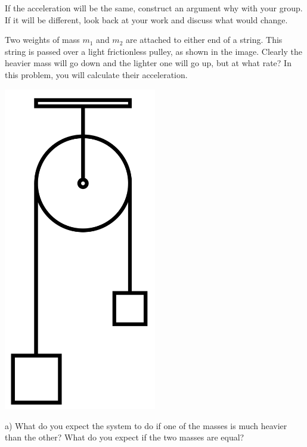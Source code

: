 \documentclass[12pt]{article}
\begin{document}
		If the acceleration will be the same, construct an argument why with your group. If it will be different, look back at your work and discuss what would change.
		
		\newpage
		
		
		\begin{minipage}{0.7\textwidth}
			Two weights of mass $m_1$ and $m_2$ are attached to either end of a string. This string is passed over a light frictionless pulley, as shown in the image.
			Clearly the heavier mass will go down and the lighter one will go up, but at what rate? In this problem, you will calculate their acceleration.
		\end{minipage} \hfill
		\begin{minipage}{0.3\textwidth}
			\begin{center}\includegraphics[width=0.5\textwidth]{atwood.png}
			\end{center}
		\end{minipage} \hfill
		
		a) What do you expect the system to do if one of the masses is much heavier than the other? What do you expect if the
		two masses are equal?
		
		\vspace{1in}
		
\end{document}
